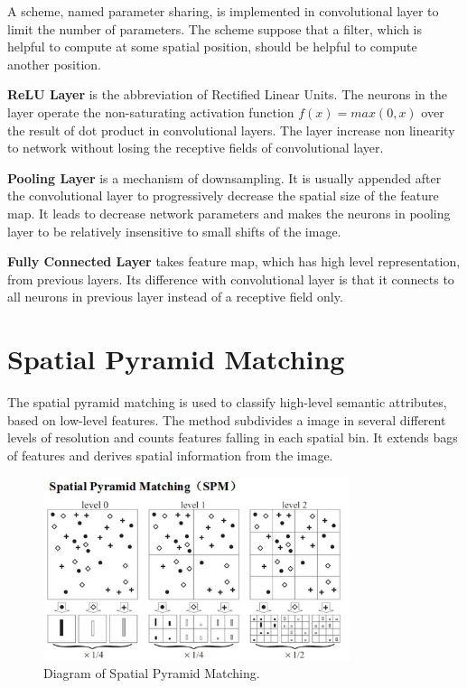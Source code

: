 A scheme, named parameter sharing, is implemented in convolutional layer to limit the number of parameters. The scheme suppose that a filter, which is helpful to compute at some spatial position, should be helpful to compute another position.

\textbf{ReLU Layer} is the abbreviation of Rectified Linear Units. The neurons in the layer operate the non-saturating activation function $f(x) = max(0,x)$ over the result of dot product in convolutional layers. The layer increase non linearity to network without losing the receptive fields of convolutional layer.

\textbf{Pooling Layer} is a mechanism of downsampling. It is usually appended after the convolutional layer to progressively decrease the spatial size of the feature map. It leads to decrease network parameters and makes the neurons in pooling layer to be relatively insensitive to small shifts of the image.

\textbf{Fully Connected Layer} takes feature map, which has high level representation, from previous layers. Its difference with convolutional layer is that it connects to all neurons in previous layer instead of a receptive field only.

\section{Spatial Pyramid Matching}

The spatial pyramid matching\citep{lazebnik2006beyond} is used to classify high-level semantic attributes, based on low-level features. The method subdivides a image in several different levels of resolution and counts features falling in each spatial bin. It extends bags of features and derives spatial information from the image.
\graphicspath{ {./Figures/} }
\begin{figure}[!htb]
\centering
\includegraphics[width=0.8\textwidth]{spm.jpg}
\caption{\label{fig:SpatialPyramidMatching}Diagram of Spatial Pyramid Matching.}
\end{figure}

